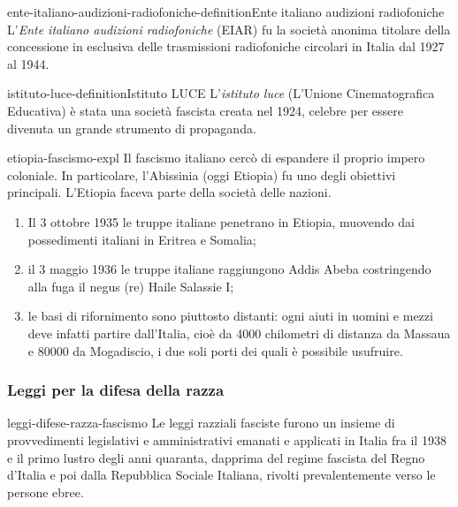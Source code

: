 \documentclass[preview]{standalone}
\begin{document}

\begin{snippetdefinition}{ente-italiano-audizioni-radiofoniche-definition}{Ente italiano audizioni radiofoniche}
    L'\textit{Ente italiano audizioni radiofoniche} (EIAR) fu la società anonima titolare
    della concessione in esclusiva delle trasmissioni radiofoniche circolari in Italia
    dal 1927 al 1944.
\end{snippetdefinition}


\begin{snippetdefinition}{istituto-luce-definition}{Istituto LUCE}
    L'\textit{istituto luce} (L'Unione Cinematografica Educativa)
    è stata una società fascista creata nel 1924, celebre per essere divenuta un grande
    strumento di propaganda.
\end{snippetdefinition}

\begin{snippet}{etiopia-fascismo-expl}
    Il fascismo italiano cercò di espandere il proprio impero coloniale.
    In particolare, l'Abissinia (oggi Etiopia) fu uno degli obiettivi principali.
    L'Etiopia faceva parte della società delle nazioni.
    \begin{enumerate}
        \item Il 3 ottobre 1935 le truppe italiane penetrano in Etiopia, muovendo dai possedimenti italiani in Eritrea e Somalia;
        \item il 3 maggio 1936 le truppe italiane raggiungono Addis Abeba costringendo alla fuga il negus (re) Haile Salassie I;
        \item le basi di rifornimento sono piuttosto distanti: ogni aiuti in uomini e mezzi deve infatti partire dall'Italia, cioè da 4000 chilometri di distanza da Massaua e 80000 da Mogadiscio, i due soli porti dei quali è possibile usufruire.
    \end{enumerate}
\end{snippet}

\subsubsection{Leggi per la difesa della razza}

\begin{snippet}{leggi-difese-razza-fascismo}
    Le leggi razziali fasciste furono un insieme di provvedimenti legislativi e amministrativi
    emanati e applicati in Italia fra il 1938 e il primo lustro degli anni quaranta,
    dapprima del regime fascista del Regno d'Italia e poi dalla Repubblica Sociale Italiana,
    rivolti prevalentemente verso le persone ebree.
\end{snippet}
\end{document}
